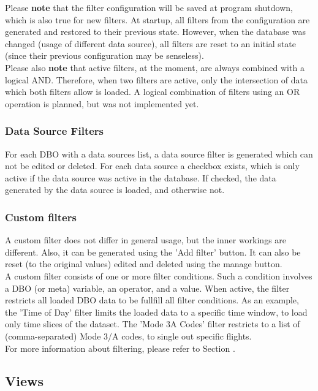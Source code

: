 Please \textbf{note} that the filter configuration will be saved at program shutdown, which is also true for new filters.   At  startup,  all  filters  from  the  configuration  are  generated  and  restored  to  their  previous  state. However, when the database was changed (usage of different data source), all filters are reset to an initial
state (since their previous configuration may be senseless). \\

Please also \textbf{note} that active filters, at the moment, are always combined with a logical AND. Therefore,
when  two  filters  are  active,  only  the  intersection  of  data  which  both  filters  allow  is  loaded.   A  logical combination of filters using an OR operation is planned, but was not implemented yet.

\subsubsection{Data Source Filters}
For each DBO with a data sources list, a data source filter is generated which can not be edited or deleted.  For each
data source a checkbox exists, which is only active if the data source was active in the database. If checked, the
data generated by the data source is loaded, and otherwise not.

\subsubsection{Custom filters}
A  custom  filter  does  not  differ  in  general  usage,  but  the  inner  workings  are  different.   Also,  it  can  be generated using the 'Add filter' button. It can also be reset (to the original values) edited and deleted using
the manage button. \\
A custom filter consists of one or more filter conditions.  Such a condition involves a DBO (or meta) variable, an operator, and a value.  When active, the filter restricts all loaded DBO data to be fullfill all filter conditions.
As an example, the 'Time of Day' filter limits the loaded data to a specific time window, to load only time slices of the dataset.  The 'Mode 3A Codes' filter restricts to a list of (comma-separated) Mode 3/A codes, to single out specific flights. \\

For more information about filtering, please refer to Section .

\subsection{Views}

